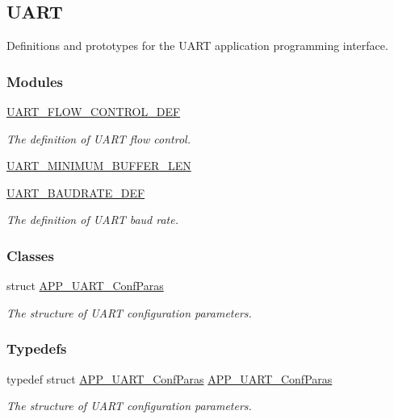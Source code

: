 \hypertarget{group___u_a_r_t}{}\subsection{U\+A\+RT}
\label{group___u_a_r_t}


Definitions and prototypes for the U\+A\+RT application programming interface.  


\subsubsection*{Modules}
\begin{DoxyCompactItemize}
\item 
\hyperlink{group___u_a_r_t___f_l_o_w___c_o_n_t_r_o_l___d_e_f}{U\+A\+R\+T\+\_\+\+F\+L\+O\+W\+\_\+\+C\+O\+N\+T\+R\+O\+L\+\_\+\+D\+EF}
\begin{DoxyCompactList}\small\item\em The definition of U\+A\+RT flow control. \end{DoxyCompactList}\item 
\hyperlink{group___u_a_r_t___m_i_n_i_m_u_m___b_u_f_f_e_r___l_e_n}{U\+A\+R\+T\+\_\+\+M\+I\+N\+I\+M\+U\+M\+\_\+\+B\+U\+F\+F\+E\+R\+\_\+\+L\+EN}
\item 
\hyperlink{group___u_a_r_t___b_a_u_d_r_a_t_e___d_e_f}{U\+A\+R\+T\+\_\+\+B\+A\+U\+D\+R\+A\+T\+E\+\_\+\+D\+EF}
\begin{DoxyCompactList}\small\item\em The definition of U\+A\+RT baud rate. \end{DoxyCompactList}\end{DoxyCompactItemize}
\subsubsection*{Classes}
\begin{DoxyCompactItemize}
\item 
struct \hyperlink{struct_a_p_p___u_a_r_t___conf_paras}{A\+P\+P\+\_\+\+U\+A\+R\+T\+\_\+\+Conf\+Paras}
\begin{DoxyCompactList}\small\item\em The structure of U\+A\+RT configuration parameters. \end{DoxyCompactList}\end{DoxyCompactItemize}
\subsubsection*{Typedefs}
\begin{DoxyCompactItemize}
\item 
typedef struct \hyperlink{struct_a_p_p___u_a_r_t___conf_paras}{A\+P\+P\+\_\+\+U\+A\+R\+T\+\_\+\+Conf\+Paras} \hyperlink{group___u_a_r_t_ga9735015d6e551eed3b78e15c889192b2}{A\+P\+P\+\_\+\+U\+A\+R\+T\+\_\+\+Conf\+Paras}\hypertarget{group___u_a_r_t_ga9735015d6e551eed3b78e15c889192b2}{}\label{group___u_a_r_t_ga9735015d6e551eed3b78e15c889192b2}

\begin{DoxyCompactList}\small\item\em The structure of U\+A\+RT configuration parameters. \end{DoxyCompactList}\end{DoxyCompactItemize}
